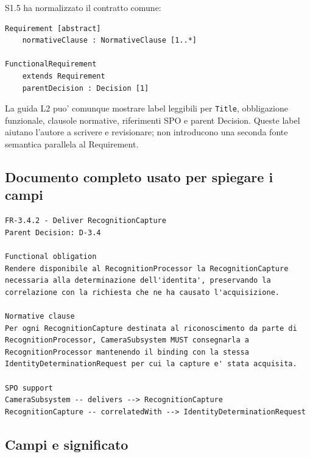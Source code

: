\documentclass[11pt,a4paper]{article}
\begin{document}
S1.5 ha normalizzato il contratto comune:

\begin{lstlisting}
Requirement [abstract]
    normativeClause : NormativeClause [1..*]

FunctionalRequirement
    extends Requirement
    parentDecision : Decision [1]
\end{lstlisting}

La guida L2 puo' comunque mostrare label leggibili per \texttt{Title}, obbligazione funzionale, clausole normative, riferimenti SPO e parent Decision. Queste label aiutano l'autore a scrivere e revisionare; non introducono una seconda fonte semantica parallela al Requirement.

\subsection{Documento completo usato per spiegare i campi}

\begin{ddtaexample}[title={Facial Access - FR-3.4.2 Deliver RecognitionCapture}]
\begin{lstlisting}
FR-3.4.2 - Deliver RecognitionCapture
Parent Decision: D-3.4

Functional obligation
Rendere disponibile al RecognitionProcessor la RecognitionCapture
necessaria alla determinazione dell'identita', preservando la
correlazione con la richiesta che ne ha causato l'acquisizione.

Normative clause
Per ogni RecognitionCapture destinata al riconoscimento da parte di
RecognitionProcessor, CameraSubsystem MUST consegnarla a
RecognitionProcessor mantenendo il binding con la stessa
IdentityDeterminationRequest per cui la capture e' stata acquisita.

SPO support
CameraSubsystem -- delivers --> RecognitionCapture
RecognitionCapture -- correlatedWith --> IdentityDeterminationRequest
\end{lstlisting}
\end{ddtaexample}

\subsection{Campi e significato}
\end{document}
